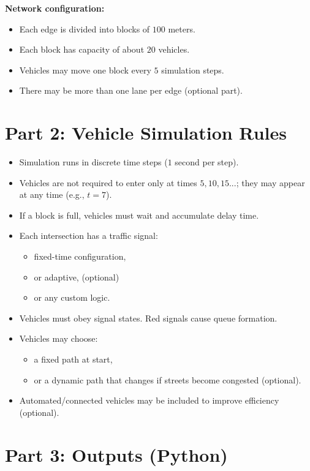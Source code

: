 \documentclass{KPS_assignment}
\begin{document}
\vspace{0.2cm}
\textbf{Network configuration:}
\begin{itemize}
    \item Each edge is divided into blocks of \(100\) meters.
    \item Each block has capacity of about \(20\) vehicles.
    \item Vehicles may move one block every \(5\) simulation steps.
    \item There may be more than one lane per edge (optional part).
\end{itemize}

\section*{Part 2: Vehicle Simulation Rules}

\begin{itemize}
    \item Simulation runs in discrete time steps (\(1\) second per step).
    \item Vehicles are not required to enter only at times \(5, 10, 15...\); they may appear at any time (e.g., \(t=7\)).
    \item If a block is full, vehicles must wait and accumulate delay time.
    \item Each intersection has a traffic signal:
    \begin{itemize}
        \item fixed-time configuration,
        \item or adaptive, (optional)
        \item or any custom logic.
    \end{itemize}
    \item Vehicles must obey signal states. Red signals cause queue formation.
    \item Vehicles may choose:
    \begin{itemize}
        \item a fixed path at start,
        \item or a dynamic path that changes if streets become congested (optional).
    \end{itemize}
    \item Automated/connected vehicles may be included to improve efficiency (optional).
\end{itemize}

\section*{Part 3: Outputs (Python)}
\end{document}

